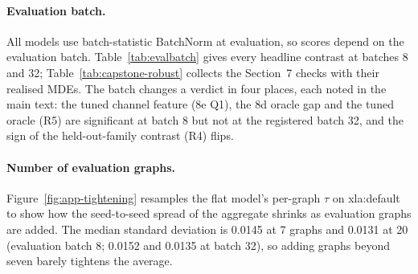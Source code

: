 \documentclass{article}
\begin{document}
\begin{table}[t]
\caption{Training settings, read from a saved checkpoint's arguments (contention-edge arm, xla:default);
the flat model's width is 172 for parameter matching. Learning rates other than 1e-3 apply only where the
text says so.}
\label{tab:hparams}
\centering
\small

\end{table}

\paragraph{Evaluation batch.} All models use batch-statistic BatchNorm at evaluation, so scores depend on
the evaluation batch. Table~\ref{tab:evalbatch} gives every headline contrast at batches 8 and 32;
Table~\ref{tab:capstone-robust} collects the Section~7 checks with their realised MDEs. The batch changes a
verdict in four places, each noted in the main text: the tuned channel feature (8e Q1), the 8d oracle gap
and the tuned oracle (R5) are significant at batch 8 but not at the registered batch 32, and the sign of
the held-out-family contrast (R4) flips.

\begin{table}[t]
\caption{Every headline contrast at evaluation batch 8 and 32 (paired over seeds). ``Primary'' is the batch
the main text reports, which is the registered batch for every pre-registered or declared contrast; -- =
not scored at that batch.}
\label{tab:evalbatch}
\centering
\scriptsize

\end{table}

\begin{table}[t]
\caption{Section~7 robustness checks on convolution Top-1 slowdown ($\Delta < 0$: first arm closer to
optimal). Realised MDE is computed from each contrast's observed paired standard deviation ($\alpha = .05$,
power 0.8), not a pre-registered MDE. Leave-one-graph-out gives the range over the three drops and the
largest $p$.}
\label{tab:capstone-robust}
\centering
\scriptsize

\end{table}

\paragraph{Number of evaluation graphs.} Figure~\ref{fig:app-tightening} resamples the flat model's
per-graph $\tau$ on xla:default to show how the seed-to-seed spread of the aggregate shrinks as evaluation
graphs are added. The median standard deviation is 0.0145 at 7 graphs and 0.0131 at 20 (evaluation batch 8;
0.0152 and 0.0135 at batch 32), so adding graphs beyond seven barely tightens the average.
\end{document}
